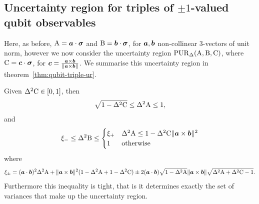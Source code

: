\subsection{Uncertainty region for triples of $\pm 1$-valued qubit observables}
\label{sec:qubit-triple-uncertainty}
Here, as before, $\operatorname{A} = \bm{a}\cdot{\boldsymbol\sigma}$ and $\operatorname{B} = \bm{b}\cdot{\boldsymbol\sigma}$, for $\bm{a}, \bm{b}$ non-collinear 3-vectors of unit norm, however we now consider the uncertainty region ${\mathrm{ PUR}}_\Delta(\operatorname{A},\operatorname{B},\operatorname{C})$, where $\operatorname{C} = \bm{c}\cdot{\boldsymbol\sigma}$, for $\bm{c} = \frac{\bm{a}\times\bm{b}}{\|\bm{a}\times\bm{b}\|}$.
We summarise this uncertainty region in theorem~\ref{thm:qubit-triple-ur}.
\begin{thm}\label{thm:qubit-triple-ur}
  Given $\var{\opc}\in[0,1]$, then 
  \begin{align}\label{eqn:qubit-triple-ur-1}
    \sqrt{1-\var{\opc}} \leq \var{\opa} \leq 1,
  \end{align}
  and
  \begin{align}\label{eqn:qubit-triple-ur-2}
    \xi_- \leq \var{\opb}   \leq\begin{cases}\xi_+ & \var{\opa} \leq 1-\var{\opc}\|\boa\times\bob\|^2\\1&\text{otherwise}\end{cases}
  \end{align}
  where
  \begin{align}\label{eqn:qubit-triple-ur-3}
    \xi_\pm = (\boa\cdot\bob)^2 \var{\opa} + \|\boa\times\bob\|^2(1-\var{\opa} + 1-\var{\opc}) \pm 2(\boa\cdot\bob)\sqrt{1-\var{\opa}}\|\boa\times\bob\|\sqrt{\var{\opa} + \var{\opc} -1}.
  \end{align}
  Furthermore this inequality is tight, that is it determines exactly the set of variances that make up the uncertainty region.
\end{thm}

